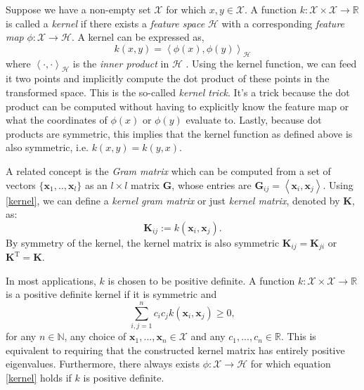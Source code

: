 Suppose we have a non-empty set  $\mathcal{X}$ for which $x,y \in \mathcal{X}$. A function $k: \mathcal{X} \times \mathcal{X} \rightarrow \mathbb{R}$ is called a \textit{kernel} if there exists a \textit{feature space} $ \mathcal{H}$ with a corresponding \textit{feature map} $\phi: \mathcal{X} \rightarrow \mathcal{H}$. A kernel can be expressed as,
\begin{equation}
\label{kernel}
k(x,y) = \left\langle \phi(x), \phi(y) \right\rangle_\mathcal{H}
\end{equation}
where $\left\langle \cdot, \cdot \right\rangle_\mathcal{H}$ is the \textit{inner product} in $ \mathcal{H}$  \cite{scholkopf2002learning}. Using the kernel function, we can feed it two points and implicitly compute the dot product of these points in the transformed space. This is the so-called \textit{kernel trick}. It's a trick because the dot product can be computed without having to explicitly know the feature map or what the coordinates of $\phi(x)$ or $\phi(y)$ evaluate to. Lastly, because dot products are symmetric, this implies that the kernel function as defined above is also symmetric, i.e. $k(x, y) = k(y, x)$.

A related concept is the \textit{Gram matrix} which can be computed from a set of vectors $\{\mathbf{x}_1,..,\mathbf{x}_l\}$ as an $l \times l$ matrix $\mathbf{G}$, whose entries are $\mathbf{G}_{ij} = \left\langle \mathbf{x}_i, \mathbf{x}_j \right\rangle$. Using \ref{kernel}, we can define a \textit{kernel gram matrix} or just \textit{kernel matrix}, denoted by $\mathbf{K}$, as:
\begin{equation}
\mathbf{K}_{ij} := k(\mathbf{x}_i, \mathbf{x}_j ).
\end{equation}
By symmetry of the kernel, the kernel matrix is also symmetric $\mathbf{K}_{ij}=\mathbf{K}_{ji}$ or $\mathbf{K}^\text{T} = \mathbf{K}$.

In most applications, $k$ is chosen to be positive definite. A function $k: \mathcal{X} \times \mathcal{X} \rightarrow \mathbb{R}$ is a positive definite kernel if it is symmetric and
\begin{equation}
\sum_{i, j=1}^{n} c_{i} c_{j} k\left(\mathbf{x}_{i}, \mathbf{x}_{j}\right) \geq 0,
\end{equation}
for any $n \in \mathbb{N}$, any choice of $\mathbf{x}_1,...,\mathbf{x}_n \in \mathcal{X}$ and any $c_1,...,c_n \in \mathbb{R}$. This is equivalent to requiring that the constructed kernel matrix has entirely positive eigenvalues. Furthermore, there always exists $\phi: \mathcal{X} \rightarrow \mathcal{H}$ for which equation \ref{kernel} holds  if $k$ is positive definite.

